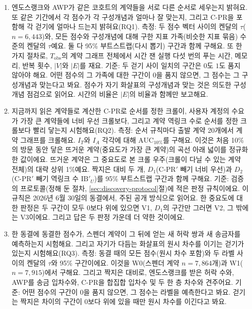 \begin{enumerate}
\item[O1.] 엔도스랭크와 AWP가 같은 코호트의 계약들을 서로 다른 순서로 세우는지 밝혀요. 또 같은 기간에서 각 점수가 각 구성개념과 얼마나 잘 맞는지, 그리고 \mbox{C-PR}을 포함해 각 걷기에 얼마나 드는지 밝혀요(RQ1). 측정: 두 점수 벡터 사이의 켄달의 $\tau$($n=6{,}443$)와, 모든 점수와 구성개념에 대해 구한 지표 가족(비슷한 지표 묶음) 수준의 켄달의 $\tau$예요. 둘 다 95\% 부트스트랩(다시 뽑기) 구간과 함께 구해요. 또 한 가지 절차로, $T_{\mathrm{obs}}$의 계약 그래프 전체에서 시간 잰 실행 다섯 번의 푸는 시간, 메모리, 반복 횟수, $|V|$와 $|E|$를 재요. 기준: 두 걷기 사이 일치의 구간은 $0$도 $1$도 품지 않아야 해요. 어떤 점수의 그 가족에 대한 구간이 $0$을 품지 않으면, 그 점수는 그 구성개념과 맞는다고 봐요. 점수가 자기 화살표의 구성개념과 맞는 것은 의도한 구성개념 점검으로 읽어요. 시간의 비율은 $|E|$의 비율과 함께만 보고해요.
\item[O2.] 지금까지 읽은 계약들로 계산한 \mbox{C-PR}로 순서를 정한 크롤이, 사용자 계정의 수요가 가장 큰 계약들에 너비 우선 크롤보다, 그리고 계약 역링크 수로 순서를 정한 크롤보다 빨리 닿는지 시험해요(RQ2). 측정: 순서 규칙마다 출발 계약 20개에서 계약 그래프를 크롤해요. $I_T$와 $I_A$ 각각에 대해 $\mathrm{AUC}_{10\%}$를 구해요. 이것은 처음 10\%의 방문 동안 닿은 뜨거운 계약(중요도가 가장 큰 계약)의 곡선 아래 넓이를 정규화한 값이에요. 뜨거운 계약은 그 중요도로 본 크롤 우주(크롤이 다닐 수 있는 계약 전체)의 대략 상위 1\%예요. 짝지은 대비 두 개, $D_1$(\mbox{C-PR}$'$ 빼기 너비 우선)과 $D_2$(\mbox{C-PR}$'$ 빼기 역링크 수 $\mathrm{IB}'_U$)를 95\% 부트스트랩 구간과 함께 구해요. 기준: 검증의 프로토콜(정해 둔 절차, \ref{sec:discovery-protocol}절)에 적은 판정 규칙이에요. 이 규칙은 2026년 6월 30일의 동결에서, 주된 공개 방식으로 읽어요. 한 중요도에 대한 판정은 두 구간이 모두 $0$보다 위에 있으면 V1, $D_1$의 구간만 그러면 V2, 그 밖에는 V3이에요. 그리고 답은 두 판정 가운데 더 약한 것이에요.
\item[O3.] 한 동결에 동결한 점수가, 스펜더 계약이 그 뒤에 얻는 새 허락 쌍과 새 송금자를 예측하는지 시험해요. 그리고 자기가 다듬는 화살표의 원시 차수를 이기는 걷기가 있는지 시험해요(RQ3). 측정: 동결 때의 모든 점수(원시 차수 포함)와 두 라벨 사이의 켄달의 $\tau$와 95\% 구간이에요. 이것을 W0(스펜더 계약 $n=7{,}864$개)과 W1($n=7{,}915$)에서 구해요. 그리고 짝지은 대비로, 엔도스랭크를 받은 허락 수와, AWP를 송금 입차수와, \mbox{C-PR}을 합집합 입차수 및 두 한 층 차수와 견주어요. 기준: 어떤 점수의 구간이 $0$을 품지 않으면, 그 점수는 라벨을 예측한다고 봐요. 걷기는 짝지은 차이의 구간이 $0$보다 위에 있을 때만 원시 차수를 이긴다고 봐요.

\end{enumerate}
